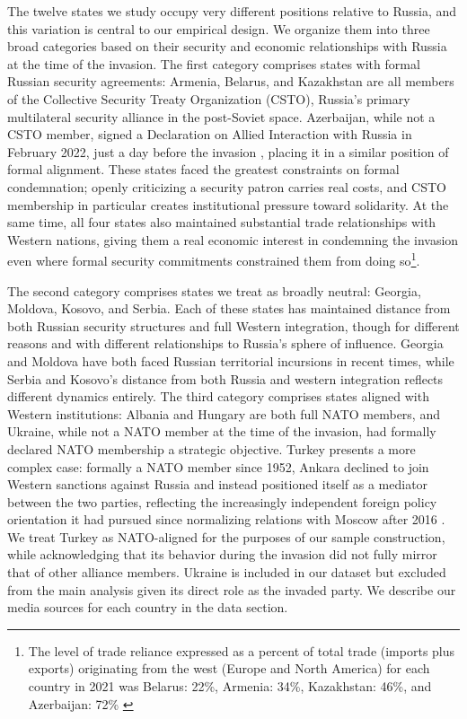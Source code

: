 \documentclass[12pt]{article}
\begin{document}
The twelve states we study occupy very different positions relative to Russia, and this variation is central to our empirical design. We organize them into three broad categories based on their security and economic relationships with Russia at the time of the invasion. The first category comprises states with formal Russian security agreements: Armenia, Belarus, and Kazakhstan are all members of the Collective Security Treaty Organization (CSTO), Russia's primary multilateral security alliance in the post-Soviet space. Azerbaijan, while not a CSTO member, signed a Declaration on Allied Interaction with Russia in February 2022, just a day before the invasion \citep{huseynov_azerbaijan_2022}, placing it in a similar position of formal alignment. These states faced the greatest constraints on formal condemnation; openly criticizing a security patron carries real costs, and CSTO membership in particular creates institutional pressure toward solidarity. At the same time, all four states also maintained substantial trade relationships with Western nations, giving them a real economic interest in condemning the invasion even where formal security commitments constrained them from doing so\footnote{The level of trade reliance expressed as a percent of total trade (imports plus exports) originating from the west (Europe and North America) for each country in 2021 was Belarus: 22\%, Armenia: 34\%, Kazakhstan: 46\%, and Azerbaijan: 72\% \citep{world_bank_world_2021}}.

The second category comprises states we treat as broadly neutral: Georgia, Moldova, Kosovo, and Serbia. Each of these states has maintained distance from both Russian security structures and full Western integration, though for different reasons and with different relationships to Russia's sphere of influence. Georgia and Moldova have both faced Russian territorial incursions in recent times\citep{cheterian_august_2009, potter_unrecognized_2022}, while Serbia and Kosovo's distance from both Russia and western integration reflects different dynamics entirely. The third category comprises states aligned with Western institutions: Albania and Hungary are both full NATO members, and Ukraine, while not a NATO member at the time of the invasion, had formally declared NATO membership a strategic objective. Turkey presents a more complex case: formally a NATO member since 1952, Ankara declined to join Western sanctions against Russia and instead positioned itself as a mediator between the two parties, reflecting the increasingly independent foreign policy orientation it had pursued since normalizing relations with Moscow after 2016 \citep{mankoff_turkeys_2022}. We treat Turkey as NATO-aligned for the purposes of our sample construction, while acknowledging that its behavior during the invasion did not fully mirror that of other alliance members. Ukraine is included in our dataset but excluded from the main analysis given its direct role as the invaded party. We describe our media sources for each country in the data section.
\end{document}

